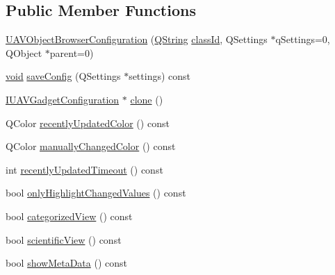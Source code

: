 \subsection*{\-Public \-Member \-Functions}
\begin{DoxyCompactItemize}
\item 
\hyperlink{group___u_a_v_object_browser_plugin_ga70fd7664c3f0a9a97f0003bc04e5dc42}{\-U\-A\-V\-Object\-Browser\-Configuration} (\hyperlink{group___u_a_v_objects_plugin_gab9d252f49c333c94a72f97ce3105a32d}{\-Q\-String} \hyperlink{group___core_plugin_gac953657221ba7fda967ada0408332641}{class\-Id}, \-Q\-Settings $\ast$q\-Settings=0, \-Q\-Object $\ast$parent=0)
\item 
\hyperlink{group___u_a_v_objects_plugin_ga444cf2ff3f0ecbe028adce838d373f5c}{void} \hyperlink{group___u_a_v_object_browser_plugin_gadb33bf1275b4c9f13153755f9f333042}{save\-Config} (\-Q\-Settings $\ast$settings) const 
\item 
\hyperlink{group___core_plugin_gacdfdf0b1e39b5002472b76b6564ce51f}{\-I\-U\-A\-V\-Gadget\-Configuration} $\ast$ \hyperlink{group___u_a_v_object_browser_plugin_ga0bf31a4c146a973fe414471258c40b9a}{clone} ()
\item 
\-Q\-Color \hyperlink{group___u_a_v_object_browser_plugin_gabd9e62445c6dafe38aff2aa05e0b63e0}{recently\-Updated\-Color} () const 
\item 
\-Q\-Color \hyperlink{group___u_a_v_object_browser_plugin_ga3c96e42ba99892a40daa0e4140285ccd}{manually\-Changed\-Color} () const 
\item 
int \hyperlink{group___u_a_v_object_browser_plugin_ga3aabfce2aedab253f923829311c4e07d}{recently\-Updated\-Timeout} () const 
\item 
bool \hyperlink{group___u_a_v_object_browser_plugin_gafaf541f03652cd6f57909b0e8c453695}{only\-Highlight\-Changed\-Values} () const 
\item 
bool \hyperlink{group___u_a_v_object_browser_plugin_gadc4b65d3776b63289a8e2981af3d218b}{categorized\-View} () const 
\item 
bool \hyperlink{group___u_a_v_object_browser_plugin_ga70ab8d21181971d5e78925921d9ce52c}{scientific\-View} () const 
\item 
bool \hyperlink{group___u_a_v_object_browser_plugin_ga02fed63cf79eb853363190d6db4139c7}{show\-Meta\-Data} () const 
\end{DoxyCompactItemize}
